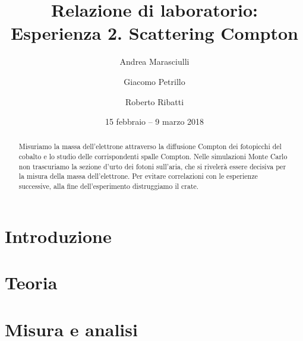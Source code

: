 \documentclass[a4paper]{article}
\title{Relazione di laboratorio:\\
Esperienza 2. Scattering Compton}
\author{Andrea Marasciulli
\and Giacomo Petrillo
\and Roberto Ribatti}
\date{15 febbraio -- 9 marzo 2018}
\begin{document}
\maketitle

\begin{abstract}
	Misuriamo la massa dell'elettrone attraverso la diffusione Compton dei fotopicchi del cobalto e lo studio delle corrispondenti spalle Compton. Nelle simulazioni Monte Carlo non trascuriamo la sezione d'urto dei fotoni sull'aria, che si rivelerà essere decisiva per la misura della massa dell'elettrone.
	Per evitare correlazioni con le esperienze successive, alla fine dell'esperimento distruggiamo il crate.
\end{abstract}

{\small \tableofcontents}

\newpage
\section{Introduzione}

%



\section{Teoria}





\section{Misura e analisi}











%
\end{document}
